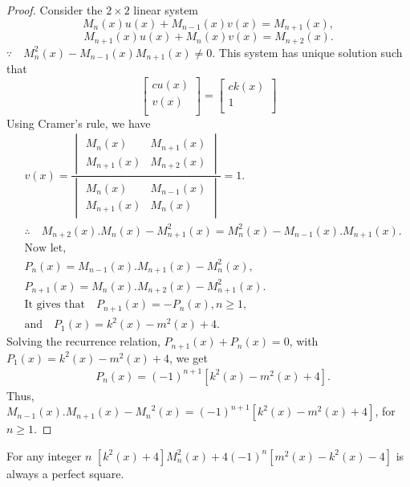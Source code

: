 \begin{proof}
Consider the ${2}\times{2}$ linear system
$$M_{n}(x)u(x)+M_{n-1}(x)v(x)=M_{n+1}(x),$$
$$M_{n+1}(x)u(x)+M_{n}(x)v(x)=M_{n+2}(x).$$
$\because \quad {M}_{n}^2(x)-M_{n-1}(x)M_{n+1}(x)\neq{0}.$
This system has unique solution such that
 $$
\begin{bmatrix}{c}
    u(x) \\
    v(x) \\
\end{bmatrix}=
          \begin{bmatrix}{c}
            k(x) \\
           1\\
          \end{bmatrix}
        $$
Using Cramer's rule, we have
\begin{align*}
&v(x)=\dfrac{ \begin{vmatrix}
    M_{n}(x) & M_{n+1}(x) \\
    M_{n+1}(x) & M_{n+2}(x)
     \end{vmatrix}}
{  \begin{vmatrix}
 M_{n}(x) & M_{n-1}(x) \\
 M_{n+1}(x) & M_{n}(x) 
             \end{vmatrix}  }=1.\\
        &\therefore\quad M_{n+2}(x).M_{n}(x)-{M}_{n+1}^2(x)={M}_{n}^2(x)-M_{n-1}(x).M_{n+1}(x).\\
&\text{Now let,}\\
&P_{n}(x) =  M_{n-1}(x).M_{n+1}(x)-{M}_{n}^2(x),\\
&P_{n+1}(x) =  M_{n}(x).M_{n+2}(x)-{M}_{n+1}^2(x).\\
&\text{It gives that}\quad P_{n+1}(x)=-P_{n}(x),n\geq{1},\\
&\text{and}\quad P_{1}(x)=k^{2}(x)-m^{2}(x)+4.
\end{align*}
Solving the recurrence relation, $P_{n+1}(x)+P_{n}(x)=0$, with $P_{1}(x)=k^{2}(x)-m^{2}(x)+4$, we get
\begin{align*}
&P_{n}(x)={(-1)}^{n+1}{[k^{2}(x)-m^{2}(x)+4]}.
\end{align*}
Thus,\\ $M_{n-1}(x).M_{n+1}(x)-{{M}_{n}}^2(x)={(-1)}^{n+1}{[{k^{2}(x)-m^{2}(x)+4}]}$, for $n\geq{1}$.
\end{proof}
\begin{theorem}
For any integer $n$
$\left[ k^{2}(x)+4\right] M_{n}^2(x)+4{(-1)}^n\left[ m^{2}(x)-k^{2}(x)-4\right] $ is always a perfect square.
\end{theorem}
